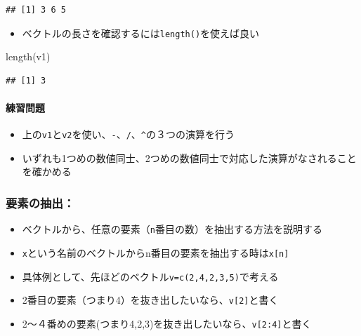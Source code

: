 \documentclass[
]{book}
\newenvironment{Shaded}{\begin{snugshade}}{\end{snugshade}}
\newcommand{\FunctionTok}[1]{\textcolor[rgb]{0.00,0.00,0.00}{#1}}
\newcommand{\NormalTok}[1]{#1}
\providecommand{\tightlist}{%
  \setlength{\itemsep}{0pt}\setlength{\parskip}{0pt}}
\begin{document}
\begin{verbatim}
## [1] 3 6 5
\end{verbatim}

\begin{itemize}
\tightlist
\item
  ベクトルの長さを確認するには\texttt{length()}を使えば良い
\end{itemize}

\begin{Shaded}
\begin{Highlighting}[]
\FunctionTok{length}\NormalTok{(v1)}
\end{Highlighting}
\end{Shaded}

\begin{verbatim}
## [1] 3
\end{verbatim}

\hypertarget{ux7df4ux7fd2ux554fux984c-3}{%
\paragraph*{練習問題}\label{ux7df4ux7fd2ux554fux984c-3}}

\begin{itemize}
\tightlist
\item
  上の\texttt{v1}と\texttt{v2}を使い、\texttt{-}、\texttt{/}、\texttt{\^{}}の３つの演算を行う
\item
  いずれも1つめの数値同士、2つめの数値同士で対応した演算がなされることを確かめる
\end{itemize}

\hypertarget{ux8981ux7d20ux306eux62bdux51fa}{%
\subsubsection*{要素の抽出：}\label{ux8981ux7d20ux306eux62bdux51fa}}

\begin{itemize}
\item
  ベクトルから、任意の要素（\texttt{n}番目の数）を抽出する方法を説明する
\item
  \texttt{x}という名前のベクトルからn番目の要素を抽出する時は\texttt{x{[}n{]}}
\item
  具体例として、先ほどのベクトル\texttt{v=c(2,4,2,3,5)}で考える
\item
  2番目の要素（つまり4）を抜き出したいなら、\texttt{v{[}2{]}}と書く
\item
  2〜４番めの要素(つまり4,2,3)を抜き出したいなら、\texttt{v{[}2:4{]}}と書く
\end{itemize}
\end{document}

